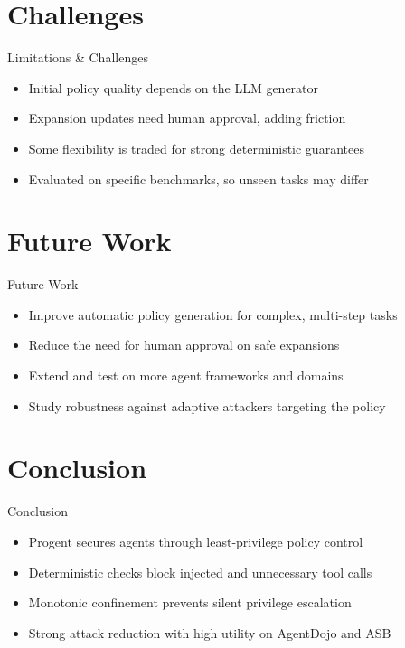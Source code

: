 \documentclass[10pt]{beamer}
\begin{document}
\section{Challenges}
\begin{frame}{Limitations \& Challenges}
\begin{itemize}
  \item Initial policy quality depends on the LLM generator
  \item Expansion updates need human approval, adding friction
  \item Some flexibility is traded for strong deterministic guarantees
  \item Evaluated on specific benchmarks, so unseen tasks may differ
\end{itemize}
\end{frame}

\section{Future Work}
\begin{frame}{Future Work}
\begin{itemize}
  \item Improve automatic policy generation for complex, multi-step tasks
  \item Reduce the need for human approval on safe expansions
  \item Extend and test on more agent frameworks and domains
  \item Study robustness against adaptive attackers targeting the policy
\end{itemize}
\end{frame}

\section{Conclusion}
\begin{frame}{Conclusion}
\begin{itemize}
  \item Progent secures agents through least-privilege policy control
  \item Deterministic checks block injected and unnecessary tool calls
  \item Monotonic confinement prevents silent privilege escalation
  \item Strong attack reduction with high utility on AgentDojo and ASB
\end{itemize}
\end{frame}
\end{document}
